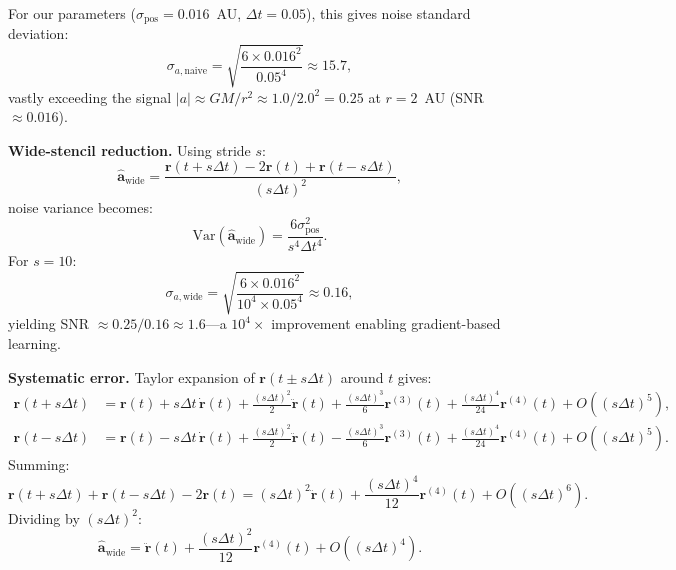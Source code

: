 \documentclass[aps,pre,reprint,superscriptaddress]{revtex4-2}
\begin{document}
For our parameters ($\sigma_{\text{pos}} = 0.016$~AU, $\Delta t = 0.05$), this gives noise standard deviation:
\begin{equation}
\sigma_{a,\text{naive}} = \sqrt{\frac{6 \times 0.016^2}{0.05^4}} \approx 15.7,
\end{equation}
vastly exceeding the signal $|a| \approx GM/r^2 \approx 1.0 / 2.0^2 = 0.25$ at $r = 2$~AU (SNR $\approx 0.016$).

\textbf{Wide-stencil reduction.} Using stride $s$:
\begin{equation}
\hat{\mathbf{a}}_{\text{wide}} = \frac{\mathbf{r}(t+s\Delta t) - 2\mathbf{r}(t) + \mathbf{r}(t-s\Delta t)}{(s\Delta t)^2},
\end{equation}
noise variance becomes:
\begin{equation}
\text{Var}(\hat{\mathbf{a}}_{\text{wide}}) = \frac{6\sigma_{\text{pos}}^2}{s^4 \Delta t^4}.
\end{equation}
For $s=10$:
\begin{equation}
\sigma_{a,\text{wide}} = \sqrt{\frac{6 \times 0.016^2}{10^4 \times 0.05^4}} \approx 0.16,
\end{equation}
yielding SNR $\approx 0.25 / 0.16 \approx 1.6$---a $10^4\times$ improvement enabling gradient-based learning.

\textbf{Systematic error.} Taylor expansion of $\mathbf{r}(t \pm s\Delta t)$ around $t$ gives:
\begin{align}
\mathbf{r}(t + s\Delta t) &= \mathbf{r}(t) + s\Delta t \, \dot{\mathbf{r}}(t) + \frac{(s\Delta t)^2}{2} \ddot{\mathbf{r}}(t) + \frac{(s\Delta t)^3}{6} \mathbf{r}^{(3)}(t) + \frac{(s\Delta t)^4}{24} \mathbf{r}^{(4)}(t) + O((s\Delta t)^5), \\
\mathbf{r}(t - s\Delta t) &= \mathbf{r}(t) - s\Delta t \, \dot{\mathbf{r}}(t) + \frac{(s\Delta t)^2}{2} \ddot{\mathbf{r}}(t) - \frac{(s\Delta t)^3}{6} \mathbf{r}^{(3)}(t) + \frac{(s\Delta t)^4}{24} \mathbf{r}^{(4)}(t) + O((s\Delta t)^5).
\end{align}
Summing:
\begin{equation}
\mathbf{r}(t + s\Delta t) + \mathbf{r}(t - s\Delta t) - 2\mathbf{r}(t) = (s\Delta t)^2 \ddot{\mathbf{r}}(t) + \frac{(s\Delta t)^4}{12} \mathbf{r}^{(4)}(t) + O((s\Delta t)^6).
\end{equation}
Dividing by $(s\Delta t)^2$:
\begin{equation}
\hat{\mathbf{a}}_{\text{wide}} = \ddot{\mathbf{r}}(t) + \frac{(s\Delta t)^2}{12} \mathbf{r}^{(4)}(t) + O((s\Delta t)^4).
\end{equation}
\end{document}
